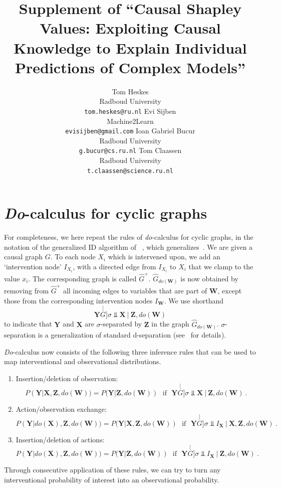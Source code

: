 \documentclass{article}
\title{Supplement of ``Causal Shapley Values: Exploiting Causal Knowledge to Explain Individual Predictions of Complex Models''}
\author{%
	Tom Heskes\\
	Radboud University\\
	\texttt{tom.heskes@ru.nl}
	\And
	Evi Sijben\\
	Machine2Learn\\
	\texttt{evisijben@gmail.com}
	\AND
	Ioan Gabriel Bucur \\
	Radboud University \\
	\texttt{g.bucur@cs.ru.nl}
	\And
	Tom Claassen\\
	Radboud University \\
	\texttt{t.claassen@science.ru.nl}
}
\newcommand{\vX}{\mathbf{X}}
\newcommand{\dodo}{\mathit{do}}
\begin{document}
\maketitle

\newcommand{\perpsg}{\stackrel[G]{\sigma}{\Perp}}
\newcommand{\vW}{\mathbf{W}}
\newcommand{\vY}{\mathbf{Y}}
\newcommand{\vZ}{\mathbf{Z}}

\section{\textit{Do}-calculus for cyclic graphs}

For completeness, we here repeat the rules of {\em do}-calculus for cyclic graphs, in the notation of the generalized ID algorithm of ~\cite{forre2019causal}, which generalizes~\cite{pearl2012calculus}. We are given a causal graph $G$. To each node $X_i$ which is intervened upon, we add an `intervention node' $I_{X_i}$, with a directed edge from $I_{X_i}$ to $X_i$ that we clamp to the value $x_i$. The corresponding graph is called $\hat{G}^+$. $\hat{G}_{\dodo(\vW)}$ is now obtained by removing from $\hat{G}^+$ all incoming edges to variables that are part of $\vW$, except those from the corresponding intervention nodes $I_{\vW}$. We use shorthand
\[
\vY \perpsg \vX ~|~ \vZ, \dodo(\mathbf{W})
\]
to indicate that $\vY$ and $\vX$ are $\sigma$-separated by $\vZ$ in the graph $\hat{G}_{\dodo(\vW)}$.  $\sigma$-separation is a generalization of standard d-separation (see~\cite{forre2019causal} for details).

\textit{Do}-calculus now consists of the following three inference rules that can be used to map interventional and observational distributions.
\begin{enumerate}
	\item Insertion/deletion of observation:
	\[
	 P(\vY|\vX,\vZ,\dodo(\vW)) = P(\vY|\vZ,\dodo(\vW)) \mbox{~~if~~} \vY \perpsg \vX ~|~ \vZ,\dodo(\vW) \: .
	\]
	\item Action/observation exchange:
	\[
	P(\vY|\dodo(\vX),\vZ,\dodo(\vW)) = P(\vY|\vX,\vZ,\dodo(\vW)) \mbox{~~if~~} \vY \perpsg I_{\vX} ~|~ \vX, \vZ, \dodo(\vW)  \: .
	\]
	\item Insertion/deletion of actions:
	\[
	P(\vY|\dodo(\vX),\vZ,\dodo(\vW)) = P(\vY|\vZ,\dodo(\vW)) \mbox{~~if~~} \vY \perpsg I_{\vX} ~|~ \vZ,\dodo(\vW) \: .
	\]	
\end{enumerate}
Through consecutive application of these rules, we can try to turn any interventional probability of interest into an observational probability.
\end{document}
